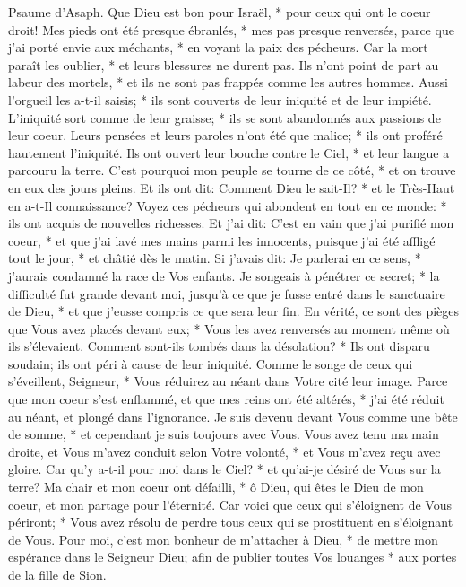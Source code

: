 Psaume d'Asaph. Que Dieu est bon pour Israël, * pour ceux qui ont le coeur droit!
Mes pieds ont été presque ébranlés, * mes pas presque renversés,
parce que j'ai porté envie aux méchants, * en voyant la paix des pécheurs.
Car la mort paraît les oublier, * et leurs blessures ne durent pas.
Ils n'ont point de part au labeur des mortels, * et ils ne sont pas frappés comme les autres hommes.
Aussi l'orgueil les a-t-il saisis; * ils sont couverts de leur iniquité et de leur impiété.
L'iniquité sort comme de leur graisse; * ils se sont abandonnés aux passions de leur coeur.
Leurs pensées et leurs paroles n'ont été que malice; * ils ont proféré hautement l'iniquité.
Ils ont ouvert leur bouche contre le Ciel, * et leur langue a parcouru la terre.
C'est pourquoi mon peuple se tourne de ce côté, * et on trouve en eux des jours pleins.
Et ils ont dit: Comment Dieu le sait-Il? * et le Très-Haut en a-t-Il connaissance?
Voyez ces pécheurs qui abondent en tout en ce monde: * ils ont acquis de nouvelles richesses.
Et j'ai dit: C'est en vain que j'ai purifié mon coeur, * et que j'ai lavé mes mains parmi les innocents,
puisque j'ai été affligé tout le jour, * et châtié dès le matin.
Si j'avais dit: Je parlerai en ce sens, * j'aurais condamné la race de Vos enfants.
Je songeais à pénétrer ce secret; * la difficulté fut grande devant moi,
jusqu'à ce que je fusse entré dans le sanctuaire de Dieu, * et que j'eusse compris ce que sera leur fin.
En vérité, ce sont des pièges que Vous avez placés devant eux; * Vous les avez renversés au moment même où ils s'élevaient.
Comment sont-ils tombés dans la désolation? * Ils ont disparu soudain; ils ont péri à cause de leur iniquité.
Comme le songe de ceux qui s'éveillent, Seigneur, * Vous réduirez au néant dans Votre cité leur image.
Parce que mon coeur s'est enflammé, et que mes reins ont été altérés, *
j'ai été réduit au néant, et plongé dans l'ignorance.
Je suis devenu devant Vous comme une bête de somme, * et cependant je suis toujours avec Vous.
Vous avez tenu ma main droite, et Vous m'avez conduit selon Votre volonté, * et Vous m'avez reçu avec gloire.
Car qu'y a-t-il pour moi dans le Ciel? * et qu'ai-je désiré de Vous sur la terre?
Ma chair et mon coeur ont défailli, * ô Dieu, qui êtes le Dieu de mon coeur, et mon partage pour l'éternité.
Car voici que ceux qui s'éloignent de Vous périront; * Vous avez résolu de perdre tous ceux qui se prostituent en s'éloignant de Vous.
Pour moi, c'est mon bonheur de m'attacher à Dieu, * de mettre mon espérance dans le Seigneur Dieu; afin de publier toutes Vos louanges * aux portes de la fille de Sion.

